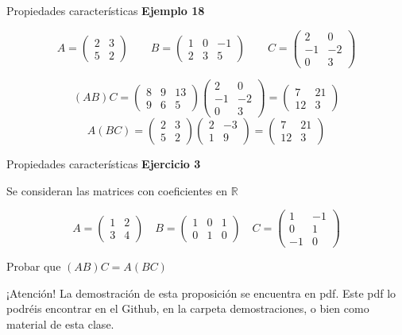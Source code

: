 \documentclass[
  ignorenonframetext,
]{beamer}
\begin{document}
\begin{frame}{Propiedades características}
\protect\hypertarget{propiedades-caracteruxedsticas-9}{}
\textbf{Ejemplo 18}

\[A = \begin{pmatrix}2&3\\5&2\end{pmatrix}\qquad B=\begin{pmatrix}1&0&-1\\2&3&5\end{pmatrix}\qquad C=\begin{pmatrix}2&0\\-1&-2\\0&3\end{pmatrix}\]

\[(AB)C=\begin{pmatrix}8&9&13\\9&6&5\end{pmatrix}\begin{pmatrix}2&0\\-1&-2\\0&3\end{pmatrix}=\begin{pmatrix}7&21\\12&3\end{pmatrix}\]
\[A(BC)=\begin{pmatrix}2&3\\5&2\end{pmatrix}\begin{pmatrix}2&-3\\1&9\end{pmatrix}=\begin{pmatrix}7&21\\12&3\end{pmatrix}\]
\end{frame}

\begin{frame}{Propiedades características}
\protect\hypertarget{propiedades-caracteruxedsticas-10}{}
\textbf{Ejercicio 3}

Se consideran las matrices con coeficientes en \(\mathbb{R}\)

\[A = \begin{pmatrix}1&2\\3&4\end{pmatrix}\quad B = \begin{pmatrix}1&0&1\\0&1&0\end{pmatrix}\quad C = \begin{pmatrix}1&-1\\0&1\\-1&0\end{pmatrix}\]

Probar que \((AB)C = A(BC)\)

¡Atención! La demostración de esta proposición se encuentra en pdf. Este
pdf lo podréis encontrar en el Github, en la carpeta demostraciones, o
bien como material de esta clase.
\end{frame}
\end{document}
